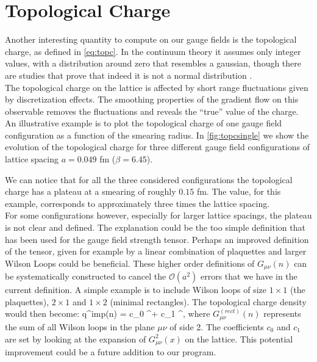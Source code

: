 
\section{Topological Charge}
Another interesting quantity to compute on our gauge fields is the topological charge, as defined in \cref{eq:topc}. In the continuum theory it assumes only integer values, with a distribution around zero that resembles a gaussian, though there are studies that prove that indeed it is not a normal distribution \cite{ce_non-gaussianities_2015}. \\
The topological charge on the lattice is affected by short range fluctuations given by discretization effects. The smoothing properties of the gradient flow on this observable removes the fluctuations and reveals the ``true'' value of the charge. An illustrative example is to plot the topological charge of one gauge field configuration as a function of the smearing radius. In \cref{fig:topcsingle} we show the evolution of the topological charge for three different gauge field configurations of lattice spacing $a=0.049$ fm ($\beta=6.45$). 

We can notice that for all the three considered configurations the topological charge has a plateau at a smearing of roughly $0.15$ fm. The value, for this example, corresponds to approximately three times the lattice spacing.\\ 
For some configurations however, especially for larger lattice spacings, the plateau is not clear and defined. The explanation could be the too simple definition that has been used for the gauge field strength tensor. Perhaps an improved definition of the tensor, given for example by a linear combination of plaquettes and larger Wilson Loops could be beneficial\cite{alexandrou_comparison_2017}. These higher order definitions of $G_{\mu\nu}(n)$ can be systematically constructed to cancel the $\mathcal{O}(a^2)$ errors that we have in the current definition. A simple example is to include Wilson loops of size $1\times1$ (the plaquettes),  $2\times1$ and $1\times2$ (minimal rectangles). The topological charge density would then become:
\beq
    q^{imp}(n) =  c_0 \epsilon^{\mu\nu\rho\sigma} + c_1 \epsilon^{\mu\nu\rho\sigma},
\eeq
where $G_{\mu\nu}^{(rect)}(n)$ represents the sum of all Wilson loops in the plane $\mu\nu$ of side 2. The coefficients $c_0$ and $c_1$ are set by looking at the expansion of $G_{\mu\nu}^2(x)$ on the lattice. This potential improvement could be a future addition to our program.

